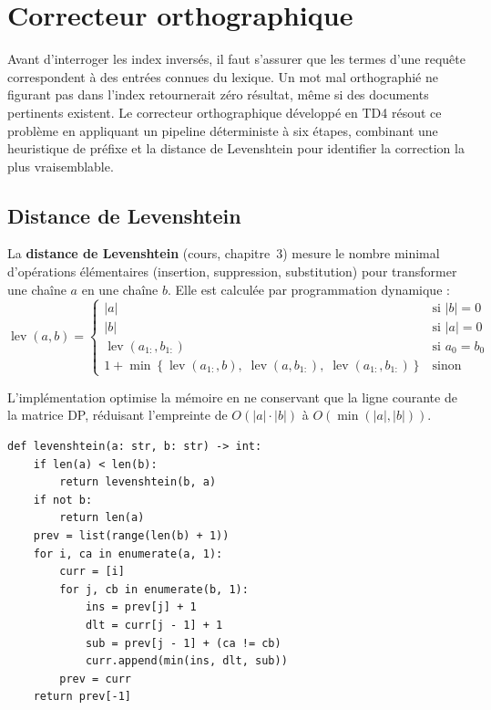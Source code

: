 \chapter{Correcteur orthographique}
\label{chap:td4}

Avant d'interroger les index inversés, il faut s'assurer que les termes d'une requête
correspondent à des entrées connues du lexique. Un mot mal orthographié ne figurant
pas dans l'index retournerait zéro résultat, même si des documents pertinents existent.
Le correcteur orthographique développé en TD4 résout ce problème en appliquant un
pipeline déterministe à six étapes, combinant une heuristique de préfixe et la
distance de Levenshtein pour identifier la correction la plus vraisemblable.

\section{Distance de Levenshtein}

La \textbf{distance de Levenshtein} (cours, chapitre~3) mesure le nombre minimal
d'opérations élémentaires (insertion, suppression, substitution) pour transformer
une chaîne $a$ en une chaîne $b$. Elle est calculée par programmation dynamique :
\begin{equation}
  \operatorname{lev}(a, b) = \begin{cases}
    |a| & \text{si } |b| = 0 \\
    |b| & \text{si } |a| = 0 \\
    \operatorname{lev}(a_{1:}, b_{1:}) & \text{si } a_0 = b_0 \\
    1 + \min\!\left\{
      \operatorname{lev}(a_{1:}, b),\;
      \operatorname{lev}(a, b_{1:}),\;
      \operatorname{lev}(a_{1:}, b_{1:})
    \right\} & \text{sinon}
  \end{cases}
  \label{eq:levenshtein}
\end{equation}

L'implémentation optimise la mémoire en ne conservant que la ligne courante de la
matrice DP, réduisant l'empreinte de $O(|a|\cdot|b|)$ à $O(\min(|a|,|b|))$.

\begin{lstlisting}[caption={Implémentation Levenshtein optimisée en mémoire},
  label={lst:levenshtein}]
def levenshtein(a: str, b: str) -> int:
    if len(a) < len(b):
        return levenshtein(b, a)
    if not b:
        return len(a)
    prev = list(range(len(b) + 1))
    for i, ca in enumerate(a, 1):
        curr = [i]
        for j, cb in enumerate(b, 1):
            ins = prev[j] + 1
            dlt = curr[j - 1] + 1
            sub = prev[j - 1] + (ca != cb)
            curr.append(min(ins, dlt, sub))
        prev = curr
    return prev[-1]
\end{lstlisting}

